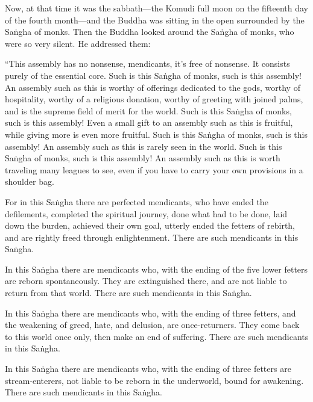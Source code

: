 \documentclass[12pt,openany]{book}%
\begin{document}
Now, at that time it was the sabbath—the Komudi full moon on the fifteenth day of the fourth month—and the Buddha was sitting in the open surrounded by the \textsanskrit{Saṅgha} of monks. Then the Buddha looked around the \textsanskrit{Saṅgha} of monks, who were so very silent. He addressed them: 

“This assembly has no nonsense, mendicants, it’s free of nonsense. It consists purely of the essential core. Such is this \textsanskrit{Saṅgha} of monks, such is this assembly! An assembly such as this is worthy of offerings dedicated to the gods, worthy of hospitality, worthy of a religious donation, worthy of greeting with joined palms, and is the supreme field of merit for the world. Such is this \textsanskrit{Saṅgha} of monks, such is this assembly! Even a small gift to an assembly such as this is fruitful, while giving more is even more fruitful. Such is this \textsanskrit{Saṅgha} of monks, such is this assembly! An assembly such as this is rarely seen in the world. Such is this \textsanskrit{Saṅgha} of monks, such is this assembly! An assembly such as this is worth traveling many leagues to see, even if you have to carry your own provisions in a shoulder bag. 

For in this \textsanskrit{Saṅgha} there are perfected mendicants, who have ended the defilements, completed the spiritual journey, done what had to be done, laid down the burden, achieved their own goal, utterly ended the fetters of rebirth, and are rightly freed through enlightenment. There are such mendicants in this \textsanskrit{Saṅgha}. 

In this \textsanskrit{Saṅgha} there are mendicants who, with the ending of the five lower fetters are reborn spontaneously. They are extinguished there, and are not liable to return from that world. There are such mendicants in this \textsanskrit{Saṅgha}. 

In this \textsanskrit{Saṅgha} there are mendicants who, with the ending of three fetters, and the weakening of greed, hate, and delusion, are once-returners. They come back to this world once only, then make an end of suffering. There are such mendicants in this \textsanskrit{Saṅgha}. 

In this \textsanskrit{Saṅgha} there are mendicants who, with the ending of three fetters are stream-enterers, not liable to be reborn in the underworld, bound for awakening. There are such mendicants in this \textsanskrit{Saṅgha}. 
\end{document}
